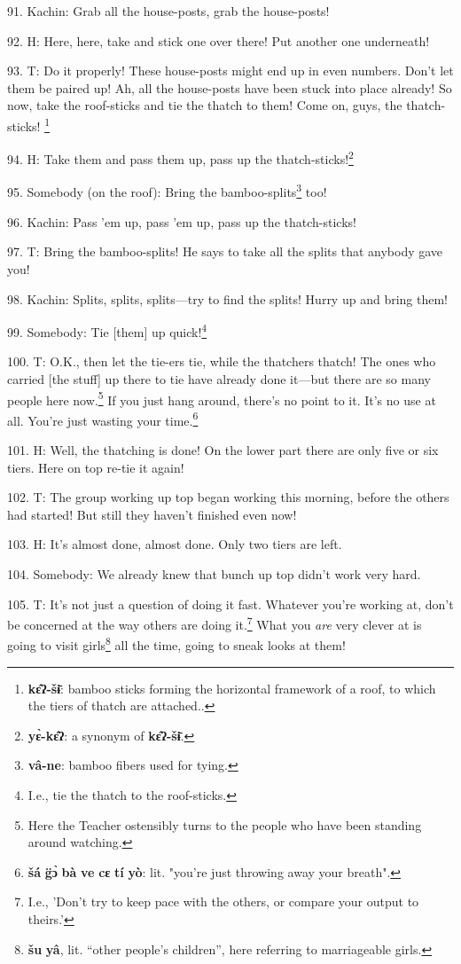91. Kachin: Grab all the house-posts, grab the house-posts!

92. H: Here, here, take and stick one over there! Put another one underneath!

93. T: Do it properly! These house-posts might end up in even numbers. Don't
let them be paired up! Ah, all the house-posts have been stuck into place already!
So now, take the roof-sticks and tie the thatch to them! Come on, guys, the thatch-sticks!
\footnote{\textbf{kɛ̂ʔ-šɨ̄}: bamboo sticks forming the horizontal framework of a roof, to which the tiers of thatch are attached..}

94. H: Take them and pass them up, pass up the thatch-sticks!\footnote{\textbf{yɛ̀-kɛ̂ʔ}: a synonym of \textbf{kɛ̂ʔ-šɨ̄}.}

95. Somebody (on the roof): Bring the bamboo-splits\footnote{\textbf{vâ-ne}: bamboo fibers used for tying.} too!

96. Kachin: Pass 'em up, pass 'em up, pass up the thatch-sticks!

97. T: Bring the bamboo-splits! He says to take all the splits that anybody gave
you!

98. Kachin: Splits, splits, splits---try to find the splits! Hurry up and bring
them!

99. Somebody: Tie [them] up quick!\footnote{I.e., tie the thatch to the roof-sticks.}

100. T: O.K., then let the tie-ers tie, while the thatchers thatch! The ones who
carried [the stuff] up there to tie have already done it---but there are so many
people here now.\footnote{Here the Teacher ostensibly turns to the people who have been standing around watching.} If you just hang around, there's no point to it. It's no
use at all. You're just wasting your time.\footnote{\textbf{šá} \textbf{g̈ɔ̀} \textbf{bà} \textbf{ve} \textbf{cɛ} \textbf{tí} \textbf{yò}: lit. "you're just throwing away your breath".}

101. H: Well, the thatching is done! On the lower part there are only five or
six tiers. Here on top re-tie it again!

102. T: The group working up top began working this morning, before the others
had started! But still they haven't finished even now!

103. H: It's almost done, almost done. Only two tiers are left.

104. Somebody: We already knew that bunch up top didn't work very hard.

105. T: It's not just a question of doing it fast. Whatever you're working at,
don't be concerned at the way others are doing it.\footnote{I.e., 'Don't try to keep pace with the others, or compare your output to theirs.'} What you \textit{are}
very clever at is going to visit girls\footnote{\textbf{šu} \textbf{yâ}, lit. ``other people's children'', here referring to marriageable girls.} all the time, going to sneak looks
at them!

